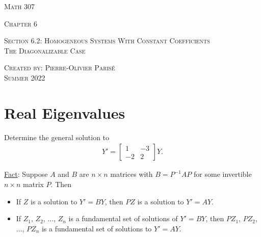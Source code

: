 \documentclass[12pt,a4paper]{article}
\newcounter{example}[section]
\begin{document}
\thispagestyle{empty}

\begin{center}
\vspace*{2.5cm}

{\Huge \textsc{Math 307}}

\vspace*{2cm}

{\LARGE \textsc{Chapter 6}} 

\vspace*{0.75cm}

\noindent\textsc{Section 6.2: Homogeneous Systems With Constant Coefficients \\The Diagonalizable Case}

\vspace*{0.75cm}

\tableofcontents

\vfill

\noindent \textsc{Created by: Pierre-Olivier Paris{\'e}} \\
\textsc{Summer 2022}
\end{center}

\newpage

\section{Real Eigenvalues}

	\begin{example}
	Determine the general solution to
		\begin{align*}
		Y' = \begin{bmatrix}
		1 & -3 \\ -2 & 2
		\end{bmatrix} Y. 
		\end{align*}
	\end{example}
	
	\vfill
	
	\underline{Fact}: Suppose $A$ and $B$ are $n \times n$ matrices with $B = P^{-1} A P$ for some invertible $n \times n$ matrix $P$. Then
		\begin{itemize}
		\item If $Z$ is a solution to $Y' = BY$, then $PZ$ is a solution to $Y' = AY$.
		\item If $Z_1$, $Z_2$, $\ldots$, $Z_n$ is a fundamental set of solutions of $Y' = BY$, then $PZ_1$, $PZ_2$, $\ldots$, $PZ_n$ is a fundamental set of solutions to $Y' = AY$.
		\end{itemize}
		
	\newpage
	
\end{document}
